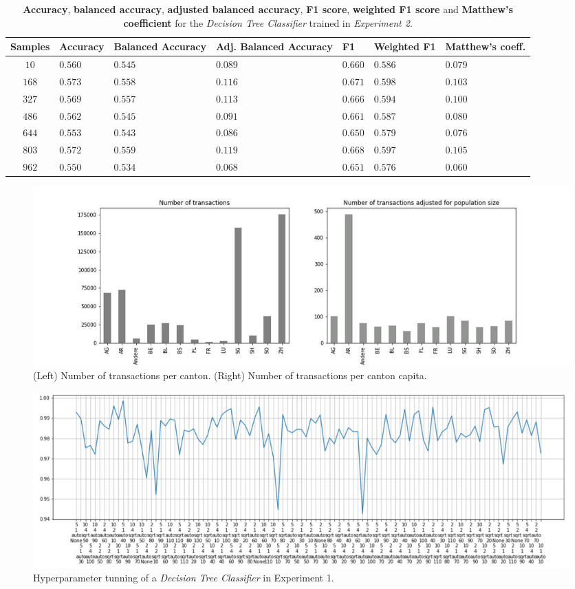 \documentclass[sigplan,screen]{acmart}
\begin{document}
\begin{table}[h]
  \caption{\textbf{Accuracy}, \textbf{balanced accuracy}, \textbf{adjusted balanced accuracy}, \textbf{F1 score}, \textbf{weighted F1 score} and \textbf{Matthew's coefficient} for the \emph{Decision Tree Classifier} trained in \emph{Experiment 2}.}
  \label{tab:dc_2_table_results}
  \begin{tabular}{cllllll}
    \toprule
    \textbf{Samples}&\textbf{Accuracy}&\textbf{Balanced Accuracy}&\textbf{Adj. Balanced Accuracy}&\textbf{F1}&\textbf{Weighted F1}&\textbf{Matthew's coeff.}\\
    \midrule
    $10$ & $0.560$ & $0.545$ & $0.089$ & $0.660$ & $0.586$ & $0.079$\\
    $168$ & $0.573$ & $0.558$ & $0.116$ & $0.671$ & $0.598$ & $0.103$\\
    $327$ & $0.569$ & $0.557$ & $0.113$ & $0.666$ & $0.594$ & $0.100$\\
    $486$ & $0.562$ & $0.545$ & $0.091$ & $0.661$ & $0.587$ & $0.080$\\
    $644$ & $0.553$ & $0.543$ & $0.086$ & $0.650$ & $0.579$ & $0.076$\\
    $803$ & $0.572$ & $0.559$ & $0.119$ & $0.668$ & $0.597$ & $0.105$\\
    $962$ & $0.550$ & $0.534$ & $0.068$ & $0.651$ & $0.576$ & $0.060$\\
    \bottomrule
    \end{tabular}
\end{table}



\begin{figure}[h]
    \centering
    \includegraphics[width=\linewidth]{reports/figures/cantonal_representation.jpg}
    \caption{(Left) Number of transactions per canton. (Right) Number of transactions per canton capita.}
    \label{fig:cantonal_representation}
\end{figure}

\begin{figure}[h]
    \centering
    \includegraphics[width=\linewidth]{reports/figures/decision_tree_1.png}
    \caption{Hyperparameter tunning of a \emph{Decision Tree Classifier} in Experiment 1.}
    \label{fig:hyp_decision_1}
\end{figure}
\end{document}
